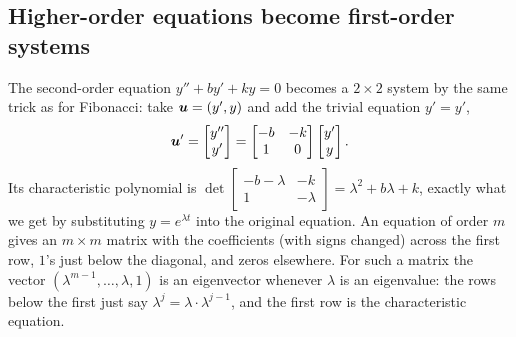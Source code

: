 \subsection{Higher-order equations become first-order systems}

The second-order equation $y''+by'+ky=0$ becomes a $2\times2$ system by the same trick as
for Fibonacci: take $\boldsymbol{u}=(y',y)$ and add the trivial equation $y'=y'$,
\[
  \boldsymbol{u}'=\begin{bmatrix} y''\\ y'\end{bmatrix}
  =\begin{bmatrix} -b&-k\\ 1&0\end{bmatrix}\begin{bmatrix} y'\\ y\end{bmatrix}.
\]
Its characteristic polynomial is
$\det\left[\begin{smallmatrix} -b-\lambda & -k\\ 1 & -\lambda\end{smallmatrix}\right]
=\lambda^{2}+b\lambda+k$, exactly what we get by substituting $y=e^{\lambda t}$ into the
original equation. An equation of order $m$ gives an $m\times m$ matrix with the
coefficients (with signs changed) across the first row, $1$'s just below the diagonal, and
zeros elsewhere. For such a matrix the vector $(\lambda^{m-1},\dots,\lambda,1)$ is an
eigenvector whenever $\lambda$ is an eigenvalue: the rows below the first just say
$\lambda^{j}=\lambda\cdot\lambda^{j-1}$, and the first row is the characteristic equation.

